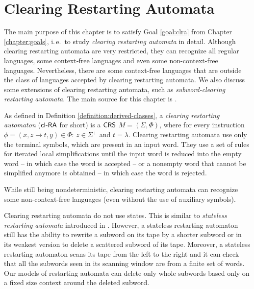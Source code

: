 \chapter{Clearing Restarting Automata}\label{chapter:clra}

The main purpose of this chapter is to satisfy Goal \ref{goal:clra} from Chapter \ref{chapter:goals}, i.\,e.\ to study \emph{clearing restarting automata} in detail. Although clearing restarting automata are very restricted, they can recognize all regular languages, some context-free languages and even some non-context-free languages. Nevertheless, there are some context-free languages that are outside the class of languages accepted by clearing restarting automata. We also discuss some extensions of clearing restarting automata, such as \emph{subword-clearing restarting automata}. The main source for this chapter is \citep{CM09, C10Diploma, CM10}.

As defined in Definition \ref{definition:derived-classes}, a \emph{clearing restarting automaton} (\index{$\clRA$}\emph{$\clRA$} for short) is a $\textup{\sf CRS\/}$ $M = (\Sigma, \Phi)$, where for every instruction $\phi = (x, z \to t, y) \in \Phi$: $z \in \Sigma^+$ and $t = \lambda$. Clearing restarting automata use only the terminal symbols, which are present in an input word. They use a set of rules for iterated local simplifications until the input word is reduced into the empty word -- in which case the word is accepted -- or a nonempty word that cannot be simplified anymore is obtained -- in which case the word is rejected.

While still being nondeterministic, clearing restarting automata can recognize some non-context-free languages (even without the use of auxiliary symbols).

Clearing restarting automata do not use states. This is similar to \emph{stateless restarting automata} introduced in \citep{KuMeOt08}. However, a stateless restarting automaton still has the ability to rewrite a subword on its tape by a shorter subword or in its weakest version to delete a scattered subword of its tape. Moreover, a stateless restarting automaton scans its tape from the left to the right and it can check that all the subwords seen in its scanning window are from a finite set of words. Our models of restarting automata can delete only whole subwords based only on a fixed size context around the deleted subword.

